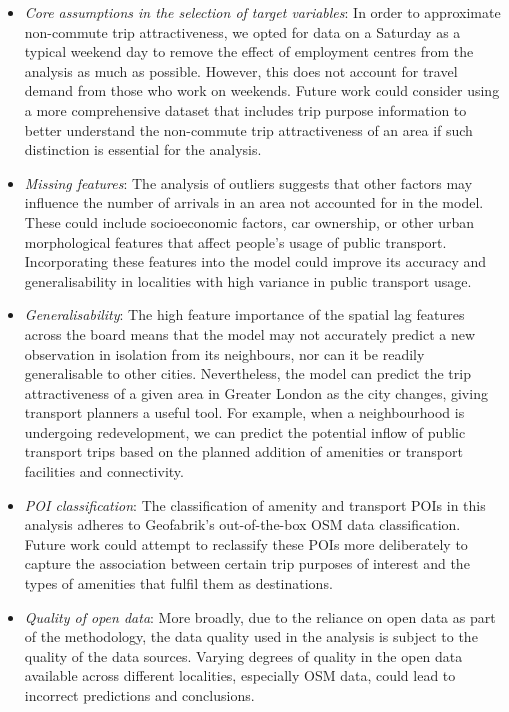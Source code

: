 \begin{itemize}
    \setlength\itemsep{0em}
    \item \textit{Core assumptions in the selection of target variables}: In order to approximate non-commute trip attractiveness, we opted for data on a Saturday as a typical weekend day to remove the effect of employment centres from the analysis as much as possible. However, this does not account for travel demand from those who work on weekends. Future work could consider using a more comprehensive dataset that includes trip purpose information to better understand the non-commute trip attractiveness of an area if such distinction is essential for the analysis. 
    \item \textit{Missing features}: The analysis of outliers suggests that other factors may influence the number of arrivals in an area not accounted for in the model. These could include socioeconomic factors, car ownership, or other urban morphological features that affect people's usage of public transport. Incorporating these features into the model could improve its accuracy and generalisability in localities with high variance in public transport usage.
    \item \textit{Generalisability}: The high feature importance of the spatial lag features across the board means that the model may not accurately predict a new observation in isolation from its neighbours, nor can it be readily generalisable to other cities. Nevertheless, the model can predict the trip attractiveness of a given area in Greater London as the city changes, giving transport planners a useful tool. For example, when a neighbourhood is undergoing redevelopment, we can predict the potential inflow of public transport trips based on the planned addition of amenities or transport facilities and connectivity.
    \item \textit{POI classification}: The classification of amenity and transport POIs in this analysis adheres to Geofabrik's out-of-the-box OSM data classification. Future work could attempt to reclassify these POIs more deliberately to capture the association between certain trip purposes of interest and the types of amenities that fulfil them as destinations.
    \item \textit{Quality of open data}: More broadly, due to the reliance on open data as part of the methodology, the data quality used in the analysis is subject to the quality of the data sources. Varying degrees of quality in the open data available across different localities, especially OSM data, could lead to incorrect predictions and conclusions. 
\end{itemize}

